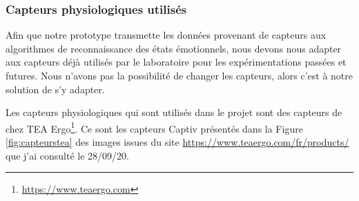 \documentclass[11pt]{article}
\begin{document}
		\subsubsection{Capteurs physiologiques utilisés}\label{sec:capteurs}
			Afin que notre prototype transmette les données provenant de capteurs aux algorithmes de reconnaissance des états émotionnels, nous devons nous adapter aux capteurs déjà utilisés par le laboratoire pour les expérimentations passées et futures.
			Nous n'avons pas la possibilité de changer les capteurs, alors c'est à notre solution de s'y adapter.\par
			Les capteurs physiologiques qui sont utilisés dans le projet sont des capteurs de chez TEA Ergo\footnote{\href{https://www.teaergo.com}{https://www.teaergo.com}}.
			Ce sont les capteurs Captiv présentés dans la Figure \ref{fig:capteurstea} des images issues du site\newline 
			\href{https://www.teaergo.com/fr/products/}{https://www.teaergo.com/fr/products/} que j'ai consulté le 28/09/20.
\end{document}
